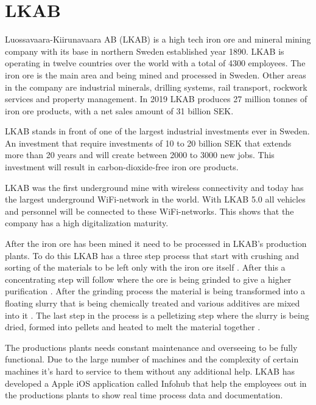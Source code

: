 \section{LKAB}
Luossavaara-Kiirunavaara AB (LKAB) is a high tech iron ore and mineral mining company with its base in northern Sweden established year 1890.
LKAB is operating in twelve countries over the world with a total of 4300 employees.
The iron ore is the main area and being mined and processed in Sweden.
Other areas in the company are industrial minerals, drilling systems, rail transport, rockwork services and property management.
In 2019 LKAB produces 27 million tonnes of iron ore products, with a net sales amount of 31 billion SEK. \cite{LKABBrief} 

\bigskip

LKAB stands in front of one of the largest industrial investments ever in Sweden.
An investment that require investments of 10 to 20 billion SEK that extends more than 20 years and will create between 2000 to 3000 new jobs.
This investment will result in carbon-dioxide-free iron ore products. \cite{LKABInvestment}

\bigskip

LKAB was the first underground mine with wireless connectivity and today has the largest underground WiFi-network in the world.
With LKAB 5.0 all vehicles and personnel will be connected to these WiFi-networks.
This shows that the company has a high digitalization maturity. \cite{LKABITDevelopment}

\bigskip

After the iron ore has been mined it need to be processed in LKAB's production plants.
To do this LKAB has a three step process that start with crushing and sorting of the materials to be left only with the iron ore itself \cite{LKABProcessSorting}.
After this a concentrating step will follow where the ore is being grinded to give a higher purification \cite{LKABProcessConcentration}. After the grinding process the material is being transformed into a floating slurry that is being chemically treated and various additives are mixed into it \cite{LKABProcessConcentration}. 
The last step in the process is a pelletizing step where the slurry is being dried, formed into pellets and heated to melt the material together \cite{LKABProcessPelletizing}. \cite{LKABProcessing} 

\bigskip

The productions plants needs constant maintenance and overseeing to be fully functional.
Due to the large number of machines and the complexity of certain machines it's hard to service to them without any additional help.
LKAB has developed a Apple iOS application called Infohub that help the employees out in the productions plants to show real time process data and documentation.

